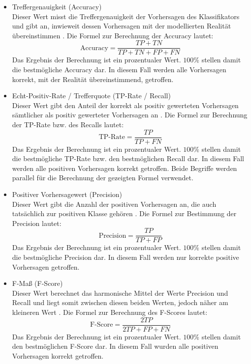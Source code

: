 \begin{itemize}
\item Treffergenauigkeit (Accuracy)
\\Dieser Wert misst die Treffergenauigkeit der Vorhersagen des Klassifikators und gibt an, inwieweit dessen Vorhersagen mit der modellierten Realität übereinstimmen \cite{Sammut2017}. Die Formel zur Berechnung der Accuracy lautet:
\\\[\text{Accuracy} = \frac{TP+TN}{TP+TN+FP+FN}\]
Das Ergebnis der Berechnung ist ein prozentualer Wert. $100\%$ stellen damit die bestmögliche Accuracy dar. In diesem Fall werden alle Vorhersagen korrekt, mit der Realität übereinstimmend, getroffen.
\item Echt-Positiv-Rate / Trefferquote (TP-Rate / Recall)
\\Dieser Wert gibt den Anteil der korrekt als positiv gewerteten Vorhersagen sämtlicher als positiv gewerteter Vorhersagen an \cite{Alpaydin2010}. Die Formel zur Berechnung der TP-Rate bzw. des Recalls lautet:
\\\[\text{TP-Rate} = \frac{TP}{TP+FN}\]
Das Ergebnis der Berechnung ist ein prozentualer Wert. $100\%$ stellen damit die bestmögliche TP-Rate bzw. den bestmöglichen Recall dar. In diesem Fall werden alle positiven Vorhersagen korrekt getroffen. Beide Begriffe werden parallel für die Berechnung der gezeigten Formel verwendet.
\item Positiver Vorhersagewert (Precision)
\\ Dieser Wert gibt die Anzahl der positiven Vorhersagen an, die auch tatsächlich zur positiven Klasse gehören \cite{Sammut2017}. Die Formel zur Bestimmung der Precision lautet:
\\\[\text{Precision} = \frac{TP}{TP+FP}\]
Das Ergebnis der Berechnung ist ein prozentualer Wert. $100\%$ stellen damit die bestmögliche Precision dar. In diesem Fall werden nur korrekte positive Vorhersagen getroffen.
\item F-Maß (F-Score)
\\ Dieser Wert berechnet das harmonische Mittel der Werte Precision und Recall und liegt somit zwischen diesen beiden Werten, jedoch näher am kleineren Wert \cite{Sammut2017}. Die Formel zur Berechnung des F-Scores lautet:
\\\[\text{F-Score} = \frac{2TP}{2TP+FP+FN}\]
Das Ergebnis der Berechnung ist ein prozentualer Wert. $100\%$ stellen damit den bestmöglichen F-Score dar. In diesem Fall wurden alle positiven Vorhersagen korrekt getroffen.
\end{itemize}

